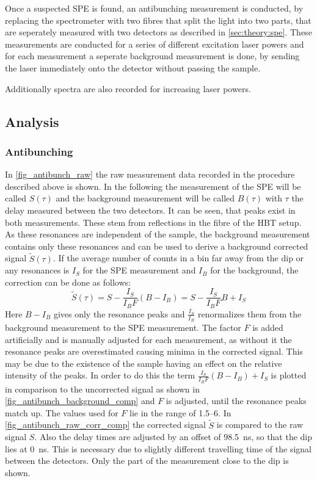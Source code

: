 Once a suspected SPE is found, an antibunching measurement is conducted, by replacing the spectrometer with two fibres that split the light into two parts, that are seperately measured with two detectors as described in \cref{sec:theory:spe}.
These measurements are conducted for a series of different excitation laser powers and for each measurement a seperate background measurement is done, by sending the laser immediately onto the detector without passing the sample.

Additionally spectra are also recorded for increasing laser powers. %

\subsection{Analysis}
\subsubsection{Antibunching}
\label{sec:spe:analysis:antibunch}

In \cref{fig_antibunch_raw} the raw measurement data recorded in the procedure described above is shown.
In the following the measurement of the SPE will be called $S(\tau)$ and the background measurement will be called $B(\tau)$ with $\tau$ the delay measured between the two detectors.
It can be seen, that peaks exist in both measurements.
These stem from reflections in the fibre of the HBT setup.
As these resonances are independent of the sample, the background measurement contains only these resonances and can be used to derive a background corrected signal $\tilde{S} (\tau)$.
If the average number of counts in a bin far away from the dip or any resonances is $I_S$ for the SPE measurement and $I_B$ for the background, the correction can be done as follows:
\begin{equation}
  \tilde{S} (\tau) = S - \frac{I_S}{I_B F} (B-I_B) = S - \frac{I_S}{I_B F} B + I_S
\end{equation}
Here $B-I_B$ gives only the resonance peaks and $\frac{I_S}{I_B}$ renormalizes them from the background measurement to the SPE measurement.
The factor $F$ is added artificially and is manually adjusted for each measurement, as without it the resonance peaks are overestimated causing minima in the corrected signal.
This may be due to the existence of the sample having an effect on the relative intensity of the peaks.
In order to do this the term $\frac{I_S}{I_B F} (B-I_B) + I_S$ is plotted in comparison to the uncorrected signal as shown in \cref{fig_antibunch_background_comp} and $F$ is adjusted, until the resonance peaks match up.
The values used for $F$ lie in the range of \SIrange{1,5}{6}{}.
In \cref{fig_antibunch_raw_corr_comp} the corrected signal $\tilde{S}$ is compared to the raw signal $S$.
Also the delay times are adjusted by an offset of \SI{98,5}{ns}, so that the dip lies at \SI{0}{ns}.
This is necessary due to slightly different travelling time of the signal between the detectors.
Only the part of the measurement close to the dip is shown.


